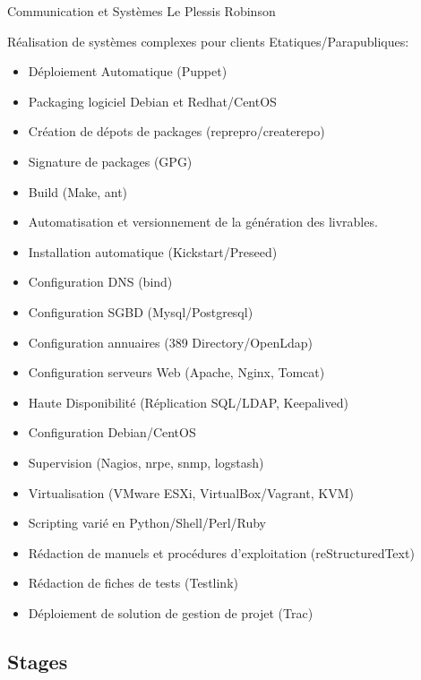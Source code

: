 \documentclass[11pt,a4paper]{moderncv}
\begin{document}
              {Communication et Systèmes}
              {Le Plessis Robinson}
              {}
              {Réalisation de systèmes complexes pour clients Etatiques/Parapubliques:
                \begin{itemize}
                \item Déploiement Automatique (Puppet)
                \item Packaging logiciel Debian et Redhat/CentOS
                \item Création de dépots de packages (reprepro/createrepo)
                \item Signature de packages (GPG)
                \item Build (Make, ant)
                \item Automatisation et versionnement de la génération des livrables.
                \item Installation automatique (Kickstart/Preseed)
                \item Configuration DNS (bind)
                \item Configuration SGBD (Mysql/Postgresql)
                \item Configuration annuaires (389 Directory/OpenLdap)
                \item Configuration serveurs Web (Apache, Nginx, Tomcat)
                \item Haute Disponibilité (Réplication SQL/LDAP, Keepalived)
                \item Configuration Debian/CentOS
                \item Supervision (Nagios, nrpe, snmp, logstash)
                \item Virtualisation (VMware ESXi, VirtualBox/Vagrant, KVM)
                \item Scripting varié en Python/Shell/Perl/Ruby
                \item Rédaction de manuels et procédures d'exploitation (reStructuredText)
                \item Rédaction de fiches de tests (Testlink)
                \item Déploiement de solution de gestion de projet (Trac)
                \end{itemize}
              }

\subsection{Stages}
\end{document}
